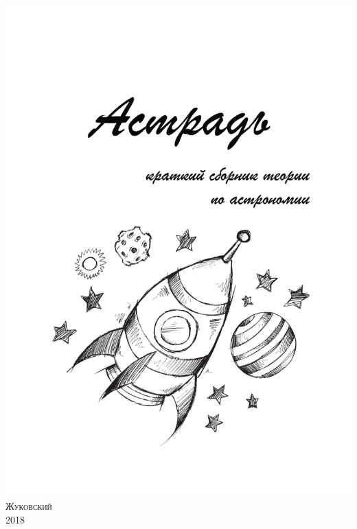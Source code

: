 \newpage
\thispagestyle{empty}
\begin{center}
\includegraphics[width=0.95\tw]{sys/cover.pdf}\\[1pc]
{\scshape Жуковский \\ 2018}	
\end{center}

